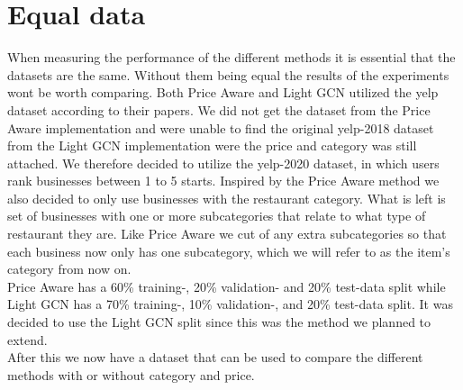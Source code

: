\section{Equal data}
When measuring the performance of the different methods it is essential that the datasets are the same.
Without them being equal the results of the experiments wont be worth comparing.
Both Price Aware and Light GCN utilized the yelp dataset according to their papers.
We did not get the dataset from the Price Aware implementation and were unable to find the original yelp-2018 dataset from the Light GCN implementation were the price and category was still attached.
We therefore decided to utilize the yelp-2020 dataset, in which users rank businesses between 1 to 5 starts.
Inspired by the Price Aware method we also decided to only use businesses with the restaurant category.
What is left is set of businesses with one or more subcategories that relate to what type of restaurant they are.
Like Price Aware we cut of any extra subcategories so that each business now only has one subcategory, which we will refer to as the item's category from now on.
\\
Price Aware has a 60\% training-, 20\% validation- and 20\% test-data split while Light GCN has a 70\% training-, 10\% validation-, and 20\% test-data split.
It was decided to use the Light GCN split since this was the method we planned to extend.
\\
After this we now have a dataset that can be used to compare the different methods with or without category and price.

